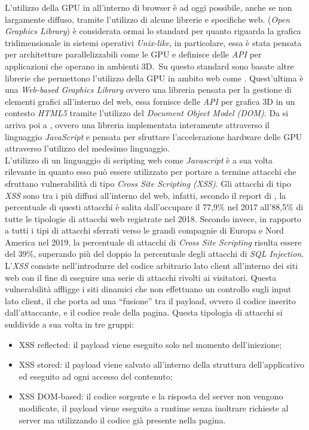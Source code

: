 \documentclass[conference, italian]{IEEEtran}
\newcommand\citen[1]{\citeauthor{#1} \citep{#1}}
\begin{document}
L'utilizzo della GPU in all'interno di browser è ad oggi possibile, anche se non largamente diffuso, tramite l'utilizzo di alcune librerie e specifiche web.  (\emph{Open Graphics Library}) è considerata ormai lo standard per quanto riguarda la grafica tridimensionale in sistemi operativi \emph{Unix-like}, in particolare, essa è stata pensata per architetture parallelizzabili come le GPU e definisce delle \emph{API} per applicazioni che operano in ambienti 3D.\ Su questo standard sono basate altre librerie che permettono l'utilizzo della GPU in ambito web come . Quest'ultima è una \emph{Web-based Graphics Library} ovvero una libreria pensata per la gestione di elementi grafici all'interno del web, essa fornisce delle \emph{API} per grafica 3D in un contesto \emph{HTML5} tramite l'utilizzo del \emph{Document Object Model (DOM)}. Da  si arriva poi a , ovvero una libreria implementata interamente attraverso il linguaggio \emph{JavaScript} e pensata per sfruttare l'accelerazione hardware delle GPU attraverso l'utilizzo del medesimo linguaggio.\\
L'utilizzo di un linguaggio di scripting web come \emph{Javascript} è a sua volta rilevante in quanto esso può essere utilizzato per portare a termine attacchi che sfruttano vulnerabilità di tipo \emph{Cross Site Scripting (XSS)}. Gli attacchi di tipo \emph{XSS} sono tra i più diffusi all'interno del web, infatti, secondo il report di \citen{PositiveTechnologiesReport}, la percentuale di questi attacchi è salita dall'occupare il 77,9\% nel 2017 all'88,5\% di tutte le tipologie di attacchi web registrate nel 2018. Secondo \citen{PreciseSecurityReport} invece, in rapporto a tutti i tipi di attacchi sferrati verso le grandi compagnie di Europa e Nord America nel 2019, la percentuale di attacchi di \emph{Cross Site Scripting} risulta essere del 39\%, superando più del doppio la percentuale degli attacchi di \emph{SQL Injection}.\\
L'\emph{XSS} consiste nell’introdurre del codice arbitrario lato client all'interno dei siti web con il fine di eseguire una serie di attacchi rivolti ai visitatori. Questa vulnerabilità affligge i siti dinamici che non effettuano un controllo sugli input lato client, il che porta ad una ``fusione'' tra il payload, ovvero il codice inserito dall'attaccante, e il codice reale della pagina. Questa tipologia di attacchi si suddivide a sua volta in tre gruppi:
\begin{itemize}
  \item XSS reflected: il payload viene eseguito solo nel momento dell’iniezione;
  \item XSS stored: il payload viene salvato all'interno della struttura dell'applicativo ed eseguito ad ogni accesso del contenuto;
  \item XSS DOM-based: il codice sorgente e la risposta del server non vengono modificate, il payload viene eseguito a runtime senza inoltrare richieste al server ma utilizzando il codice già presente nella pagina.
\end{itemize}
\end{document}
